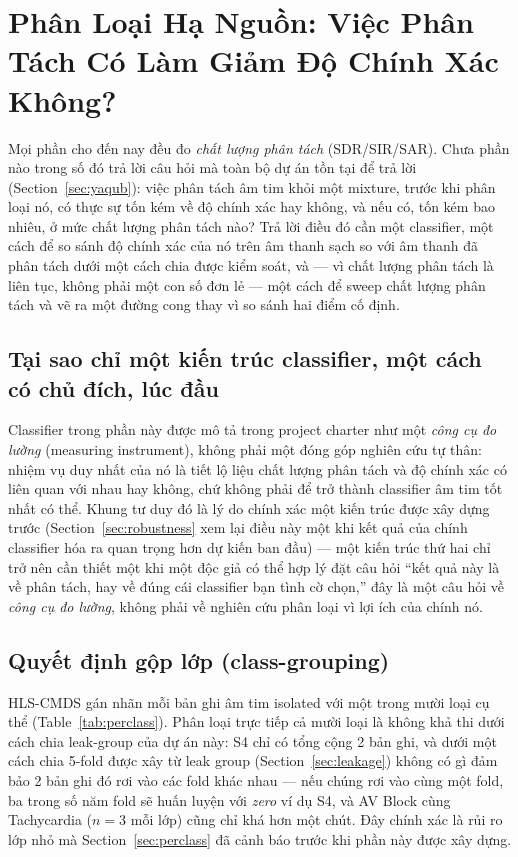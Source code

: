 \documentclass[11pt]{article}
\begin{document}
\section{Phân Loại Hạ Nguồn: Việc Phân Tách Có Làm Giảm Độ Chính Xác Không?}
\label{sec:classifier}

Mọi phần cho đến nay đều đo \emph{chất lượng phân tách} (SDR/SIR/SAR).
Chưa phần nào trong số đó trả lời câu hỏi mà toàn bộ dự án tồn tại để trả
lời (Section~\ref{sec:yaqub}): việc phân tách âm tim khỏi một mixture,
trước khi phân loại nó, có thực sự tốn kém về độ chính xác hay không, và
nếu có, tốn kém bao nhiêu, ở mức chất lượng phân tách nào? Trả lời điều
đó cần một classifier, một cách để so sánh độ chính xác của nó trên âm
thanh sạch so với âm thanh đã phân tách dưới một cách chia được kiểm
soát, và --- vì chất lượng phân tách là liên tục, không phải một con số
đơn lẻ --- một cách để sweep chất lượng phân tách và vẽ ra một đường cong
thay vì so sánh hai điểm cố định.

\subsection{Tại sao chỉ một kiến trúc classifier, một cách có chủ đích, lúc đầu}
\label{sec:onearchitecture}

Classifier trong phần này được mô tả trong project charter như một
\emph{công cụ đo lường} (measuring instrument), không phải một đóng góp
nghiên cứu tự thân: nhiệm vụ duy nhất của nó là tiết lộ liệu chất lượng
phân tách và độ chính xác có liên quan với nhau hay không, chứ không phải
để trở thành classifier âm tim tốt nhất có thể. Khung tư duy đó là lý do
chính xác một kiến trúc được xây dựng trước (Section~\ref{sec:robustness}
xem lại điều này một khi kết quả của chính classifier hóa ra quan trọng
hơn dự kiến ban đầu) --- một kiến trúc thứ hai chỉ trở nên cần thiết một
khi một độc giả có thể hợp lý đặt câu hỏi ``kết quả này là về phân tách,
hay về đúng cái classifier bạn tình cờ chọn,'' đây là một câu hỏi về
\emph{công cụ đo lường}, không phải về nghiên cứu phân loại vì lợi ích
của chính nó.

\subsection{Quyết định gộp lớp (class-grouping)}
\label{sec:classgrouping}

HLS-CMDS gán nhãn mỗi bản ghi âm tim isolated với một trong mười loại cụ
thể (Table~\ref{tab:perclass}). Phân loại trực tiếp cả mười loại là không
khả thi dưới cách chia leak-group của dự án này: S4 chỉ có tổng cộng 2
bản ghi, và dưới một cách chia 5-fold được xây từ leak group
(Section~\ref{sec:leakage}) không có gì đảm bảo 2 bản ghi đó rơi vào các
fold khác nhau --- nếu chúng rơi vào cùng một fold, ba trong số năm fold
sẽ huấn luyện với \emph{zero} ví dụ S4, và AV Block cùng Tachycardia
($n{=}3$ mỗi lớp) cũng chỉ khá hơn một chút. Đây chính xác là rủi ro lớp
nhỏ mà Section~\ref{sec:perclass} đã cảnh báo trước khi phần này được
xây dựng.
\end{document}
